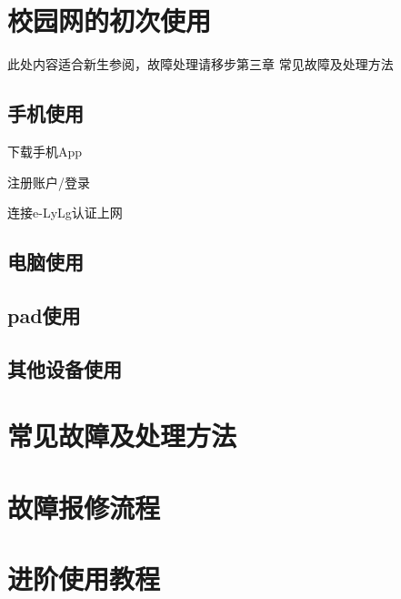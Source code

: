 \documentclass[lang=cn,11pt,chinese,base=hide]{elegantbook}
\begin{document}
\chapter{校园网的初次使用}

\begin{remark}
此处内容适合新生参阅，故障处理请移步第三章  常见故障及处理方法
\end{remark}

\section{手机使用}

\begin{introduction}
  \item 下载手机App
  \item 注册账户/登录
  \item 连接e-LyLg认证上网
\end{introduction}

\section{电脑使用}

\section{pad使用}

\section{其他设备使用}

\chapter{常见故障及处理方法}

\chapter{故障报修流程}

\chapter{进阶使用教程}
\end{document}
